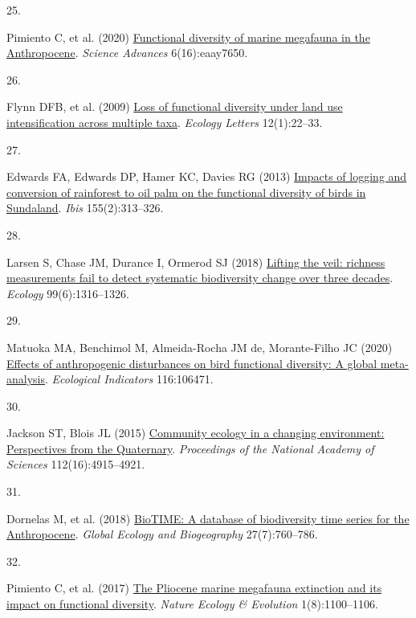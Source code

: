\documentclass{article}
\newlength{\cslhangindent}
\newlength{\csllabelwidth}
\newlength{\cslentryspacingunit} %
\newenvironment{CSLReferences}[2] %
 {%
  \setlength{\parindent}{0pt}
  \ifodd #1
  \let\oldpar\par
  \def\par{\hangindent=\cslhangindent\oldpar}
  \fi
  \setlength{\parskip}{#2\cslentryspacingunit}
 }%
 {}
\newcommand{\CSLLeftMargin}[1]{\parbox[t]{\csllabelwidth}{#1}}
\newcommand{\CSLRightInline}[1]{\parbox[t]{\linewidth - \csllabelwidth}{#1}\break}
\begin{document}
\begin{CSLReferences}{0}{0}
\leavevmode{}%
\CSLLeftMargin{25. }%
\CSLRightInline{Pimiento C, et al. (2020)
\href{https://doi.org/10.1126/sciadv.aay7650}{Functional diversity of
marine megafauna in the Anthropocene}. \emph{Science Advances}
6(16):eaay7650.}

\leavevmode{}%
\CSLLeftMargin{26. }%
\CSLRightInline{Flynn DFB, et al. (2009)
\href{https://doi.org/10.1111/j.1461-0248.2008.01255.x}{Loss of
functional diversity under land use intensification across multiple
taxa}. \emph{Ecology Letters} 12(1):22--33.}

\leavevmode{}%
\CSLLeftMargin{27. }%
\CSLRightInline{Edwards FA, Edwards DP, Hamer KC, Davies RG (2013)
\href{https://doi.org/10.1111/ibi.12027}{Impacts of logging and
conversion of rainforest to oil palm on the functional diversity of
birds in Sundaland}. \emph{Ibis} 155(2):313--326.}

\leavevmode{}%
\CSLLeftMargin{28. }%
\CSLRightInline{Larsen S, Chase JM, Durance I, Ormerod SJ (2018)
\href{https://doi.org/10.1002/ecy.2213}{Lifting the veil: richness
measurements fail to detect systematic biodiversity change over three
decades}. \emph{Ecology} 99(6):1316--1326.}

\leavevmode{}%
\CSLLeftMargin{29. }%
\CSLRightInline{Matuoka MA, Benchimol M, Almeida-Rocha JM de,
Morante-Filho JC (2020)
\href{https://doi.org/10.1016/j.ecolind.2020.106471}{Effects of
anthropogenic disturbances on bird functional diversity: A global
meta-analysis}. \emph{Ecological Indicators} 116:106471.}

\leavevmode{}%
\CSLLeftMargin{30. }%
\CSLRightInline{Jackson ST, Blois JL (2015)
\href{https://doi.org/10.1073/pnas.1403664111}{Community ecology in a
changing environment: Perspectives from the Quaternary}.
\emph{Proceedings of the National Academy of Sciences}
112(16):4915--4921.}

\leavevmode{}%
\CSLLeftMargin{31. }%
\CSLRightInline{Dornelas M, et al. (2018)
\href{https://doi.org/10.1111/geb.12729}{BioTIME: A database of
biodiversity time series for the Anthropocene}. \emph{Global Ecology and
Biogeography} 27(7):760--786.}

\leavevmode{}%
\CSLLeftMargin{32. }%
\CSLRightInline{Pimiento C, et al. (2017)
\href{https://doi.org/10.1038/s41559-017-0223-6}{The Pliocene marine
megafauna extinction and its impact on functional diversity}.
\emph{Nature Ecology \& Evolution} 1(8):1100--1106.}


\end{CSLReferences}
\end{document}
